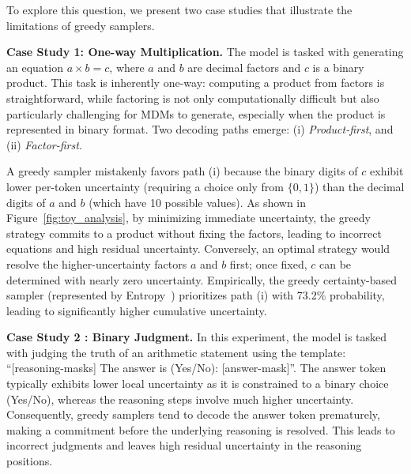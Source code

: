To explore this question, we present two case studies that illustrate the limitations of greedy samplers.

\noindent \textbf{Case Study 1: One-way Multiplication.}  
The model is tasked with generating an equation \(a \times b = c\), where \(a\) and \(b\) are decimal factors and \(c\) is a binary product. This task is {inherently one-way}: computing a product from factors is straightforward, while factoring is not only computationally difficult but also particularly challenging for MDMs to generate, especially when the product is represented in binary format. Two decoding paths emerge: (i) \textit{Product-first}, and (ii) \textit{Factor-first}. 

A greedy sampler mistakenly favors path (i) because the binary digits of \(c\) exhibit lower per-token uncertainty (requiring a choice only from \(\{0,1\}\)) than the decimal digits of \(a\) and \(b\) (which have 10 possible values). As shown in Figure~\ref{fig:toy_analysis}, by minimizing immediate uncertainty, the greedy strategy commits to a product without fixing the factors, leading to incorrect equations and high residual uncertainty. Conversely, an optimal strategy would resolve the higher-uncertainty factors \(a\) and \(b\) first; once fixed, \(c\) can be determined with nearly zero uncertainty. Empirically, the greedy certainty-based sampler (represented by Entropy~\cite{ye2025dream}) prioritizes path (i) with 73.2\% probability, leading to significantly higher cumulative uncertainty.

\noindent \textbf{Case Study 2 : Binary Judgment.}
In this experiment, the model is tasked with judging the truth of an arithmetic statement using the template: ``[reasoning-masks] The answer is (Yes/No): [answer-mask]''. The answer token typically exhibits lower local uncertainty as it is constrained to a binary choice (Yes/No), whereas the reasoning steps involve much higher uncertainty. Consequently, greedy samplers tend to decode the answer token prematurely, making a commitment before the underlying reasoning is resolved. This leads to incorrect judgments and leaves high residual uncertainty in the reasoning positions. 

